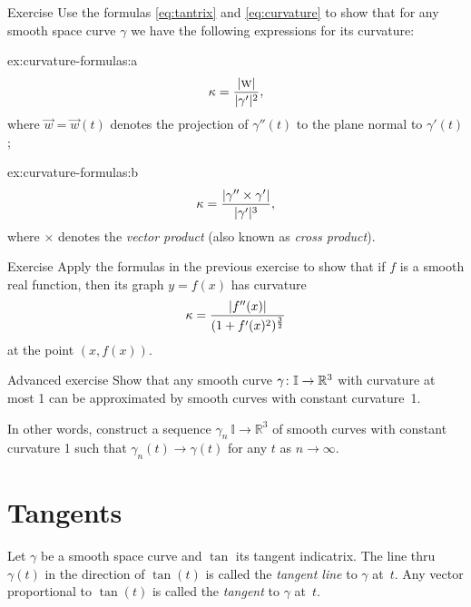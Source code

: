 \begin{thm}{Exercise}\label{ex:curvature-formulas}
Use the formulas \ref{eq:tantrix} and \ref{eq:curvature} to show that 
for any smooth space curve $\gamma$ we have the following expressions for its curvature:
\setlength{\columnseprule}{0.4pt}
\begin{multicols}{2}

\begin{subthm}{ex:curvature-formulas:a} 
\[\kappa=\frac{|\text{\sc{w}}|}{|\gamma'|^2},\]
where $\vec w=\vec w(t)$ denotes the projection of $\gamma''(t)$ to the plane normal to $\gamma'(t)$;
\end{subthm}

\begin{subthm}{ex:curvature-formulas:b}
\[\kappa=\frac{|\gamma''\times \gamma'|}{|\gamma'|^{3}},\]
where $\times$ denotes the \emph{vector product} (also known as \emph{cross product}).
\end{subthm}
\end{multicols}
\end{thm}


\begin{thm}{Exercise}\label{ex:curvature-graph}
Apply the formulas in the previous exercise to show that if $f$ is a smooth real function,
then its graph $y=f(x)$  has curvature
\[\kappa=\frac{|f''(x)|}{(1+f'(x)^2)^{\frac32}}\]
at the point $(x,f(x))$.
\end{thm}

\begin{thm}{Advanced exercise}\label{ex:approximation-const-curvature}
Show that any smooth curve $\gamma\:\mathbb{I}\z\to\mathbb{R}^3$ with curvature at most 1 can be approximated by smooth curves with constant curvature~1.

In other words, construct a sequence $\gamma_n\:\mathbb{I}\to\mathbb{R}^3$ of smooth curves  with constant curvature 1 such that $\gamma_n(t)\to \gamma(t)$ for any $t$ as $n\to\infty$.
\end{thm}

\section{Tangents}

Let $\gamma$ be a smooth space curve and $\tan$ its tangent indicatrix.
The line thru $\gamma(t)$ in the direction of $\tan(t)$ is called the \emph{tangent line} to $\gamma$  at~$t$.
Any vector proportional to $\tan(t)$ is called the \emph{tangent} to $\gamma$ at~$t$.

